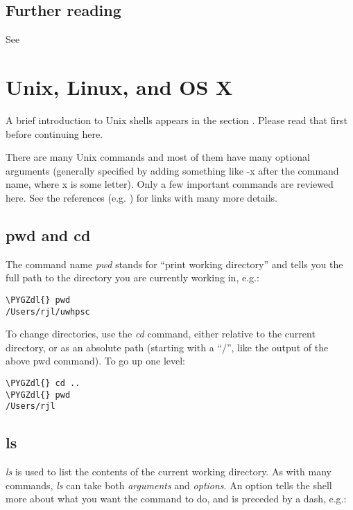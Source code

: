 \documentclass[letterpaper,10pt,english]{sphinxmanual}
\def\PYGZdl{\char`\$}
\begin{document}
\subsection{Further reading}
\label{shells:further-reading}
See \label{shells:id7}{\hyperref[biblio:ipython\string-documentation]{}}


\section{Unix, Linux, and OS X}
\label{unix:unix}\label{unix::doc}\label{unix:unix-linux-and-os-x}
A brief introduction to Unix shells appears in the section {\hyperref[shells:shells]{}}.
Please read that first before continuing here.

There are many Unix commands and most of them have many optional arguments
(generally specified by adding something like -x after the command name,
where x is some letter).   Only a few important commands are reviewed here.
See the references (e.g. \label{unix:id1}{\hyperref[biblio:wikipedia\string-unix\string-utilities]{}})
for links with many more details.


\subsection{pwd and cd}
\label{unix:pwd-and-cd}
The command name \emph{pwd} stands for ``print working directory'' and tells you
the full path to the directory you are currently working in, e.g.:

\begin{Verbatim}[commandchars=\\\{\}]
\PYGZdl{} pwd
/Users/rjl/uwhpsc
\end{Verbatim}

To change directories, use the \emph{cd} command, either relative to the current
directory, or as an absolute path (starting with a ``/'', like the output of
the above pwd command).  To go up one level:

\begin{Verbatim}[commandchars=\\\{\}]
\PYGZdl{} cd ..
\PYGZdl{} pwd
/Users/rjl
\end{Verbatim}


\subsection{ls}
\label{unix:ls}
\emph{ls} is used to list the contents of the current working directory.
As with many commands, \emph{ls} can take both \emph{arguments} and \emph{options}.  An
option tells the shell more about what you want the command to do, and is
preceded by a dash, e.g.:
\end{document}
